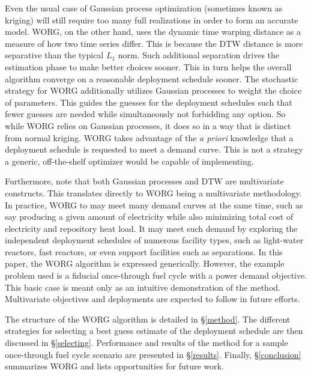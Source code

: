 Even the usual case of
Gaussian process optimization (sometimes known as kriging)
\cite{osborne2009gaussian,simpson2001kriging} will still
require too many full realizations in order to form an accurate model.
WORG, on the other hand, uses the dynamic time warping distance as a
measure of how two time series differ. This is because the DTW distance is
more separative than the typical
$L_1$ norm. Such additional separation drives the estimation phase to make
better choices
sooner. This in turn helps the overall algorithm converge on a reasonable
deployment schedule sooner.
The stochastic strategy for WORG additionally utilizes Gaussian processes to
weight the choice of parameters. This guides the guesses for the deployment
schedules such that fewer guesses are needed while simultaneously
not forbidding
any option.  So while WORG relies on Gaussian processes, it does so in a way
that is distinct from normal kriging. WORG
takes advantage of the \emph{a priori} knowledge that a deployment
schedule is requested to meet a demand curve. This is not a strategy a
generic, off-the-shelf optimizer would be capable of implementing.

Furthermore, note that both Gaussian processes and
DTW are multivariate constructs. This translates directly to WORG being
a multivariate methodology. In practice, WORG to may meet many
demand curves at the same time, such as say producing a given amount of
electricity while also minimizing total cost of electricity and
repository heat load. It may meet such demand by exploring the
independent deployment schedules of numerous facility types, such as
light-water reactors, fast reactors, or even support facilities such as
separations. In this paper, the WORG algorithm is expressed generically.
However, the example problem used is a fiducial once-through fuel cycle
with a power demand objective. This basic case is meant only as an
intuitive demonstration of the method. Multivariate objectives and deployments
are expected to follow in future efforts.

The structure of the WORG algorithm is detailed in \S\ref{method}.
The different strategies for selecting a best guess estimate of the
deployment schedule are then discussed in \S\ref{selecting}. Performance
and results of the method for a sample once-through fuel cycle scenario
are presented in \S\ref{results}. Finally, \S\ref{conclusion} summarizes
WORG and lists opportunities for future work.
